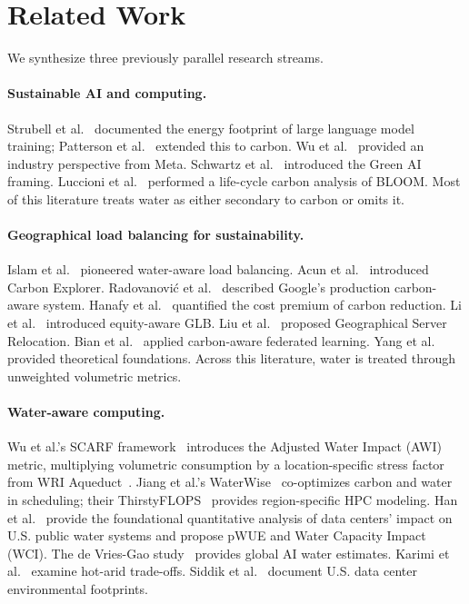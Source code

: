 \documentclass[conference,10pt]{IEEEtran}
\begin{document}
\section{Related Work}
\label{sec:related}

We synthesize three previously parallel research streams.

\paragraph{Sustainable AI and computing.}
Strubell et al.~\cite{strubell2019energy} documented the energy footprint
of large language model training; Patterson et al.~\cite{patterson2022carbon}
extended this to carbon. Wu et al.~\cite{wu2022sustainable} provided an
industry perspective from Meta. Schwartz et al.~\cite{schwartz2020green}
introduced the Green AI framing. Luccioni et al.~\cite{luccioni2023bloom}
performed a life-cycle carbon analysis of BLOOM. Most of this literature
treats water as either secondary to carbon or omits it.

\paragraph{Geographical load balancing for sustainability.}
Islam et al.~\cite{islam2018water} pioneered water-aware load balancing.
Acun et al.~\cite{acun2023carbon} introduced Carbon Explorer.
Radovanovi\'{c} et al.~\cite{radovanovic2023carbon} described Google's
production carbon-aware system. Hanafy et al.~\cite{hanafy2024going}
quantified the cost premium of carbon reduction. Li et
al.~\cite{li2024equitable} introduced equity-aware GLB. Liu et
al.~\cite{liu2024gsr} proposed Geographical Server Relocation. Bian et
al.~\cite{bian2024cafe} applied carbon-aware federated learning. Yang
et al.~\cite{yang2023acrl} provided theoretical foundations. Across
this literature, water is treated through unweighted volumetric metrics.

\paragraph{Water-aware computing.}
Wu et al.'s SCARF framework~\cite{wu2025scarf} introduces the Adjusted
Water Impact (AWI) metric, multiplying volumetric consumption by a
location-specific stress factor from WRI
Aqueduct~\cite{kuzma2023aqueduct}. Jiang et al.'s
WaterWise~\cite{jiang2025waterwise} co-optimizes carbon and water in
scheduling; their ThirstyFLOPS~\cite{jiang2025thirsty} provides
region-specific HPC modeling. Han et al.~\cite{han2026} provide the
foundational quantitative analysis of data centers' impact on U.S.
public water systems and propose pWUE and Water Capacity Impact (WCI).
The de Vries-Gao study~\cite{devries2026} provides global AI water
estimates. Karimi et al.~\cite{karimi2022water} examine hot-arid
trade-offs. Siddik et al.~\cite{siddik2021environmental} document U.S.
data center environmental footprints.
\end{document}
